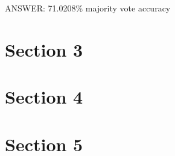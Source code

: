 \documentclass{report}
\begin{document}
ANSWER: 71.0208\% majority vote accuracy

\chapter{Section 3}

\chapter{Section 4}

\chapter{Section 5}
\end{document}
